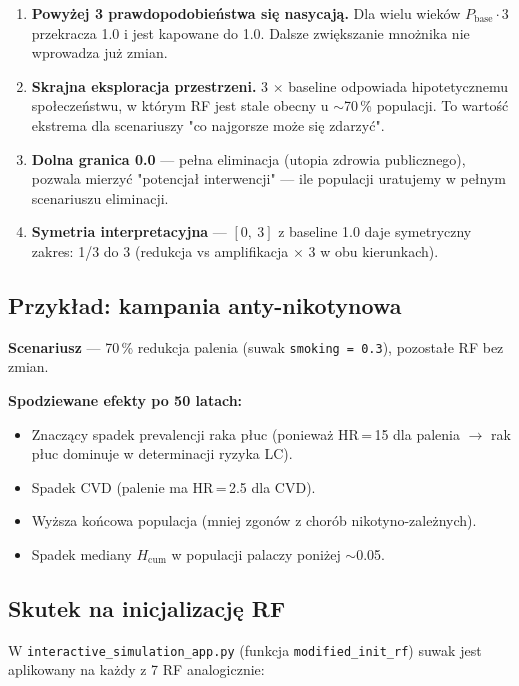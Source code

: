 \documentclass[11pt,a4paper]{article}
\begin{document}
\begin{enumerate}[leftmargin=*]
  \item \textbf{Powyżej 3 prawdopodobieństwa się nasycają.} Dla wielu wieków $P_{\text{base}} \cdot 3$ przekracza 1.0 i jest kapowane do 1.0. Dalsze zwiększanie mnożnika nie wprowadza już zmian.
  \item \textbf{Skrajna eksploracja przestrzeni.} 3 $\times$ baseline odpowiada hipotetycznemu społeczeństwu, w którym RF jest stale obecny u $\sim$70\,\% populacji. To wartość ekstrema dla scenariuszy "co najgorsze może się zdarzyć".
  \item \textbf{Dolna granica 0.0} --- pełna eliminacja (utopia zdrowia publicznego), pozwala mierzyć "potencjał interwencji" --- ile populacji uratujemy w pełnym scenariuszu eliminacji.
  \item \textbf{Symetria interpretacyjna} --- $[0,\ 3]$ z baseline 1.0 daje symetryczny zakres: 1/3 do 3 (redukcja vs amplifikacja $\times$ 3 w obu kierunkach).
\end{enumerate}

\subsection{Przykład: kampania anty-nikotynowa}

\begin{infobox}
\textbf{Scenariusz} --- 70\,\% redukcja palenia (suwak \texttt{smoking = 0.3}), pozostałe RF bez zmian.

\smallskip

\textbf{Spodziewane efekty po 50 latach:}
\begin{itemize}
  \item Znaczący spadek prevalencji raka płuc (ponieważ HR\,=\,15 dla palenia $\to$ rak płuc dominuje w determinacji ryzyka LC).
  \item Spadek CVD (palenie ma HR\,=\,2.5 dla CVD).
  \item Wyższa końcowa populacja (mniej zgonów z chorób nikotyno-zależnych).
  \item Spadek mediany $H_{\mathrm{cum}}$ w populacji palaczy poniżej $\sim$0.05.
\end{itemize}
\end{infobox}

\subsection{Skutek na inicjalizację RF}

W \texttt{interactive\_simulation\_app.py} (funkcja \texttt{modified\_init\_rf}) suwak jest aplikowany na każdy z 7 RF analogicznie:
\end{document}
